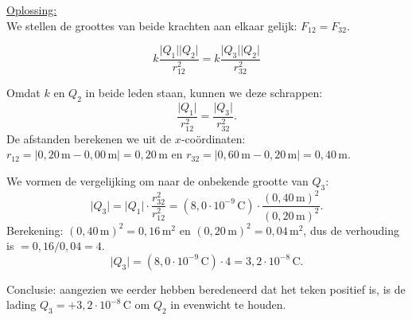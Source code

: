 \documentclass{ximera}
\begin{document}
\begin{exercise}
\begin{question}
\begin{solution}
            \underline{Oplossing:}\\
            We stellen de groottes van beide krachten aan elkaar gelijk: $F_{12}=F_{32}$. 
            
            \[
                k\frac{\lvert Q_{1} \rvert \lvert Q_{2} \rvert}{r_{12}^{2}} = k\frac{\lvert Q_{3} \rvert \lvert Q_{2} \rvert}{r_{32}^{2}}
            \]
            
            Omdat \(k\) en \(Q_{2}\) in beide leden staan, kunnen we deze schrappen:
            \[
                \frac{\lvert Q_{1} \rvert}{r_{12}^{2}}=\frac{\lvert Q_{3} \rvert}{r_{32}^{2}}.
            \]
            De afstanden berekenen we uit de $x$-coördinaten: \(r_{12}=|0{,}20 \, \mathrm{m}-0{,}00 \, \mathrm{m}|=0{,}20 \, \mathrm{m}\) en \(r_{32}=|0{,}60 \, \mathrm{m}-0{,}20 \, \mathrm{m}|=0{,}40 \, \mathrm{m}\).
    
            We vormen de vergelijking om naar de onbekende grootte van \(Q_{3}\):
            \[
                \lvert Q_{3} \rvert = \lvert Q_{1} \rvert \cdot \frac{r_{32}^{2}}{r_{12}^{2}}
                = (8{,}0 \cdot 10^{-9} \, \mathrm{C}) \cdot \frac{(0{,}40 \, \mathrm{m})^{2}}{(0{,}20 \, \mathrm{m})^{2}}.
            \]
            Berekening: \((0{,}40 \, \mathrm{m})^{2}=0{,}16 \, \mathrm{m^2}\) en \((0{,}20 \, \mathrm{m})^{2}=0{,}04 \, \mathrm{m^2}\), dus de verhouding is \(=0{,}16/0{,}04=4\).
            \[
                \lvert Q_{3} \rvert = (8{,}0 \cdot 10^{-9} \, \mathrm{C}) \cdot 4 = \boxed{3{,}2 \cdot 10^{-8} \, \mathrm{C}}.
            \]
    
            Conclusie: aangezien we eerder hebben beredeneerd dat het teken positief is, is de lading $Q_{3} = +3{,}2 \cdot 10^{-8} \, \mathrm{C}$ om \(Q_{2}\) in evenwicht te houden.
        \end{solution}
    \end{question}
\end{exercise}
\end{document}
